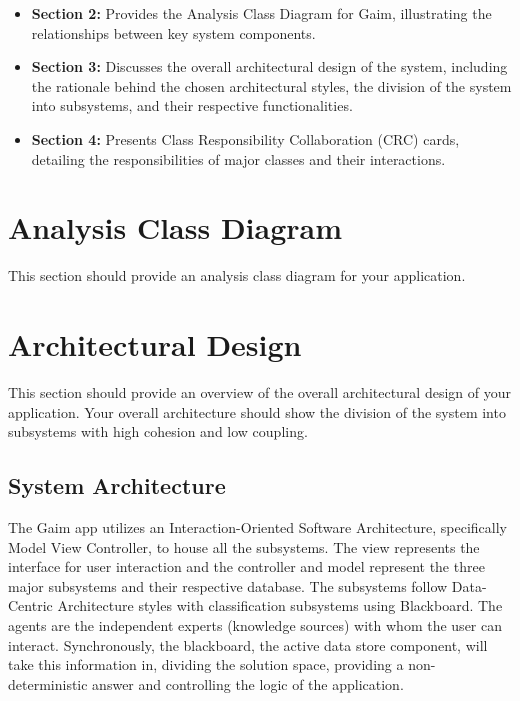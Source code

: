 \documentclass[]{article}
\begin{document}
\begin{itemize}
    \item \textbf{Section 2:} Provides the Analysis Class Diagram for Gaim, illustrating the relationships between key system components.
    \item \textbf{Section 3:} Discusses the overall architectural design of the system, including the rationale behind the chosen architectural styles, the division of the system into subsystems, and their respective functionalities.
    \item \textbf{Section 4:} Presents Class Responsibility Collaboration (CRC) cards, detailing the responsibilities of major classes and their interactions.
\end{itemize}




\section{Analysis Class Diagram}
\label{sec:analysis_class_diagram}
This section should provide an analysis class diagram for your application.


\section{Architectural Design}
\label{sec:architectural_design}
This section should provide an overview of the overall architectural design of your application. Your overall architecture should show the division of the system into subsystems with high cohesion and low coupling.

\subsection{System Architecture}
\label{sub:system_architecture}
The Gaim app utilizes an Interaction-Oriented Software Architecture, specifically Model View Controller, to house all the subsystems. The view represents the interface for user interaction and the controller and model represent the three major subsystems and their respective database. The subsystems follow Data-Centric Architecture styles with classification subsystems using Blackboard. The agents are the independent experts (knowledge sources) with whom the user can interact. Synchronously, the blackboard, the active data store component, will take this information in, dividing the solution space, providing a non-deterministic answer and controlling the logic of the application. \\
\end{document}
